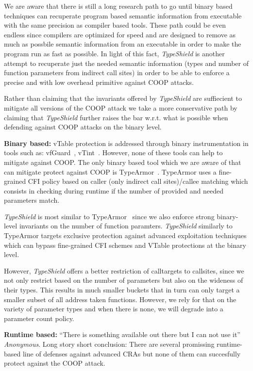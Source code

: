 We are aware that there is still a long research path to go until binary based techniques can 
recuperate program based semantic information from executable with the same precision as compiler based tools.
These path could be even endless since compilers are optimized for speed and are designed to remove as much as possbile semantic information
from an executable in order to make the program run as fast as possible. In light of this fact,
\textit{TypeShield} is another attempt to recuperate just the needed semantic information (types and number of function parameters from
indirect call sites) in order to be able to enforce a precise and with low overhead primitive against COOP attacks.

Rather than claiming that the invariants offered by \textit{TypeShield} are suffiecient
to mitigate all versions of the COOP attack we take a more conservative path by claiming that \textit{TypeShield} 
further raises the bar w.r.t. what is possible when defending against COOP attacks on the binary level.

\textbf{Binary based:} vTable protection is addressed through binary instrumentation in tools
such as: vfGuard~\cite{vfuard:aravind}, vTint~\cite{vtint:zhang}. However, none of these tools can
help to mitigate against COOP. The only binary based tool which we are aware of that
can mitigate protect against COOP is TypeArmor~\cite{veen:typearmor}.  
TypeArmor uses a fine-grained CFI policy based on caller (only indirect call sites)/callee matching 
which consists in checking during runtime if the number of provided and needed parameters match.

\textit{TypeShield} is most similar to TypeArmor~\cite{veen:typearmor} since
we also enforce strong binary-level invariants on the number of function
paramters. \textit{TypeShield} similarly to TypeArmor targets 
exclusive protection against advanced exploitation techniques 
which can bypass fine-grained CFI schemes and VTable protections at the binary level.

However, \textit{TypeShield} offers a better restriction of calltargets to callsites, since we not only restrict based on the number of parameters but also on the wideness of their types. This results in much smaller buckets that in turn can only target a smaller subset of all address taken functions. However, we rely for that on the variety of parameter types and when there is none, we will degrade into a parameter count policy.

\textbf{Runtime based:}
``There is something available out there but I can not use it'' \textit{Anonymous}.
Long story short conclusion: There are several promissing runtime-based line of defenses against
advanced CRAs but none of them can succesfully protect against the COOP attack.

